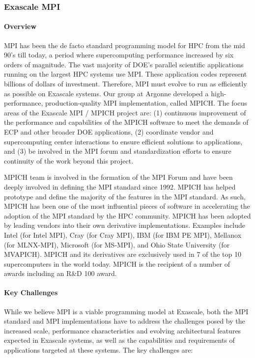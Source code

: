 \subsubsection{ Exascale MPI} \label{subsubsect:mpich}
\paragraph{Overview}

MPI has been the de facto standard programming model for HPC from the
mid 90's till today, a period where supercomputing performance
increased by six orders of magnitude.  The vast majority of DOE's
parallel scientific applications running on the largest HPC systems
use MPI. These application codes represent billions of dollars of
investment. Therefore, MPI must evolve to run as efficiently as
possible on Exascale systems. Our group at Argonne developed a
high-performance, production-quality MPI implementation, called MPICH.
The focus areas of the Exascale MPI / MPICH project are: (1)
continuous improvement of the performance and capabilities of the
MPICH software to meet the demands of ECP and other broader DOE
applications, (2) coordinate vendor and supercomputing center
interactions to ensure efficient solutions to applications, and (3) be
involved in the MPI forum and standardization efforts to ensure
continuity of the work beyond this project.

MPICH team is involved in the formation of the MPI Forum and have been
deeply involved in defining the MPI standard since 1992. MPICH has
helped prototype and define the majority of the features in the MPI
standard. As such, MPICH has been one of the most influential pieces of
software in accelerating the adoption of the MPI standard by the HPC
community. MPICH has been adopted by leading vendors into their own
derivative implementations. Examples include Intel (for Intel MPI), Cray
(for Cray MPI), IBM (for IBM PE MPI), Mellanox (for MLNX-MPI), Microsoft
(for MS-MPI), and Ohio State University (for MVAPICH). MPICH and its
derivatives are exclusively used in 7 of the top 10 supercomputers in
the world today. MPICH is the recipient of a number of awards including
an R\&D 100 award.

\paragraph{Key Challenges}

While we believe MPI is a viable programming model at Exascale, both
the MPI standard and MPI implementations have to address the
challenges posed by the increased scale, performance characteristics
and evolving architectural features expected in Exascale systems, as
well as the capabilities and requirements of applications targeted at
these systems. The key challenges are:

